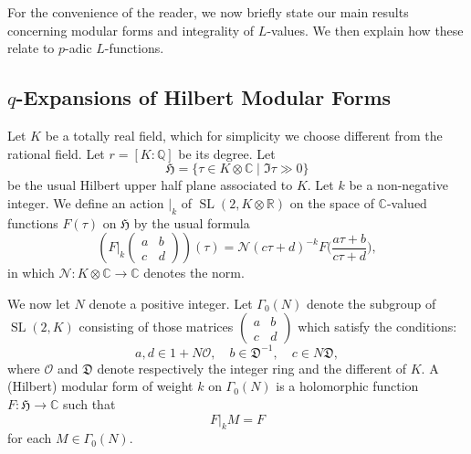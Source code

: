 \documentclass[12pt,a4paper]{article}
\theoremstyle{plain}
\theoremstyle{definition}
\DeclareMathOperator{\SL}{SL}
\newcommand{\OO}{\mathcal{O}}
\newcommand{\DD}{\mathfrak{D}}
\newcommand{\Q}{\mathbb{Q}}
\newcommand{\R}{\mathbb{R}}
\newcommand{\C}{\mathbb{C}}
\begin{document}
For the convenience of the reader, we now briefly state our main results concerning modular forms and integrality of $L$-values. We then explain how these relate to $p$-adic $L$-functions.

\subsection*{$q$-Expansions of Hilbert Modular Forms}

Let $K$ be a totally real field, which for simplicity we choose different from the rational field. Let $r=[K:\Q]$ be its degree. Let
\[
\mathfrak{H}=\{\tau\in K\otimes\C\mid\Im\tau\gg0\}
\]
be the usual Hilbert upper half plane associated to $K$. Let $k$ be a non-negative integer. We define an action $|_k$ of $\SL(2,K\otimes\R)$ on the space of $\C$-valued functions $F(\tau)$ on $\mathfrak{H}$ by the usual formula
\[
(F|_k\begin{pmatrix}a&b\\c&d\end{pmatrix})(\tau)=\mathcal{N}(c\tau+d)^{-k}F\Big(\frac{a\tau+b}{c\tau+d}\Big),
\]
in which $\mathcal{N}:K\otimes\C\to\C$ denotes the norm.

We now let $N$ denote a positive integer. Let $\Gamma_0(N)$ denote the subgroup of $\SL(2,K)$ consisting of those matrices $\begin{pmatrix}a&b\\c&d\end{pmatrix}$ which satisfy the conditions:
\[
a,d\in1+N\OO,\quad b\in\DD^{-1},\quad c\in N\DD,
\]
where $\OO$ and $\DD$ denote respectively the integer ring and the different of $K$. A (Hilbert) modular form of weight $k$ on $\Gamma_0(N)$ is a holomorphic function $F:\mathfrak{H}\to\C$ such that
\[
F|_kM=F
\]
for each $M\in\Gamma_0(N)$.
\end{document}
